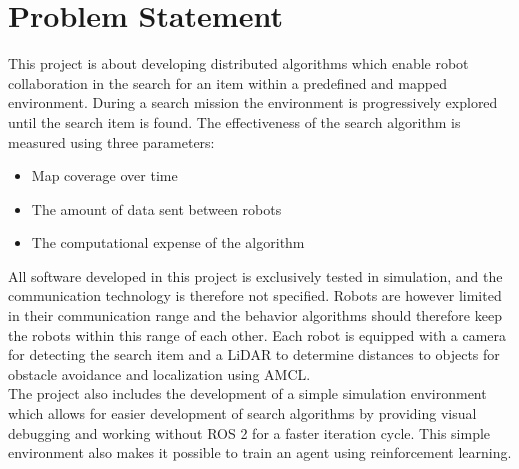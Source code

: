 \section{Problem Statement}
\label{sec:problem-statement}

This project is about developing distributed algorithms which enable robot collaboration in the search for an item within a predefined and mapped environment. During a search mission the environment is progressively explored until the search item is found. The effectiveness of the search algorithm is measured using {\color{red} three} parameters:

\begin{itemize}
    \item Map coverage over time
    \item The amount of data sent between robots
    \item The computational expense of the algorithm
\end{itemize}

All software developed in this project is exclusively tested in simulation, and the communication technology is therefore not specified. Robots are however limited in their communication range and the behavior algorithms should therefore keep the robots within this range of each other. Each robot is equipped with a camera for detecting the search item and a LiDAR to determine distances to objects for obstacle avoidance and localization using AMCL. \\

The project also includes the development of a simple simulation environment which allows for easier development of search algorithms by providing visual debugging and working without ROS 2 for a faster iteration cycle. This simple environment also makes it possible to train an agent using reinforcement learning.

